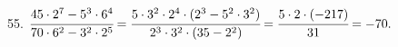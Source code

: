55. $\cfrac{45\cdot2^7-5^3\cdot6^4}{70\cdot6^2-3^2\cdot2^5}=
\cfrac{5\cdot3^2\cdot2^4\cdot(2^3-5^2\cdot3^2)}{2^3\cdot3^2\cdot(35-2^2)}=
\cfrac{5\cdot2\cdot(-217)}{31}=-70.$\\
